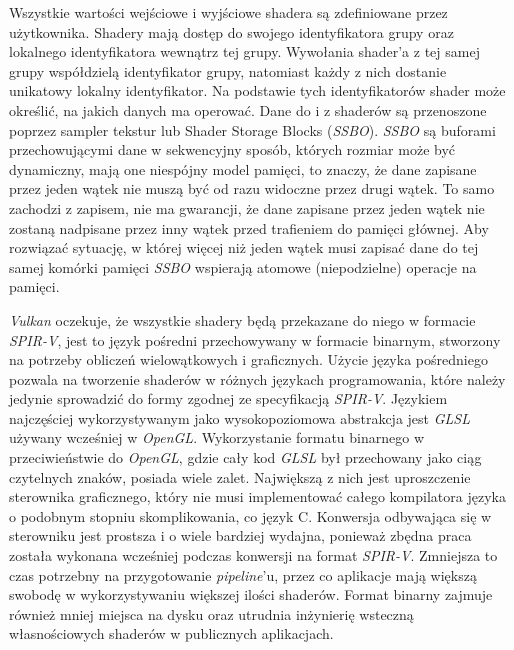 Wszystkie wartości wejściowe i wyjściowe shadera są zdefiniowane przez użytkownika.
Shadery mają dostęp do swojego identyfikatora grupy oraz lokalnego identyfikatora wewnątrz tej grupy.
Wywołania shader'a z tej samej grupy współdzielą identyfikator grupy, natomiast każdy z nich dostanie unikatowy lokalny identyfikator.
Na podstawie tych identyfikatorów shader może określić, na jakich danych ma operować.
Dane do i z shaderów są przenoszone poprzez sampler tekstur lub Shader Storage Blocks (\textit{SSBO}).
\textit{SSBO} są buforami przechowującymi dane w sekwencyjny sposób, których rozmiar może być dynamiczny, mają one niespójny model pamięci, to znaczy, że dane zapisane przez jeden wątek nie muszą być od razu widoczne przez drugi wątek.
To samo zachodzi z zapisem, nie ma gwarancji, że dane zapisane przez jeden wątek nie zostaną nadpisane przez inny wątek przed trafieniem do pamięci głównej.  
Aby rozwiązać sytuację, w której więcej niż jeden wątek musi zapisać dane do tej samej komórki pamięci \textit{SSBO} wspierają atomowe (niepodzielne) operacje na pamięci.

\textit{Vulkan} oczekuje, że wszystkie shadery będą przekazane do niego w formacie \textit{SPIR-V}\cite{SPIRVSpec}, jest to język pośredni przechowywany w formacie binarnym, stworzony na potrzeby obliczeń wielowątkowych i graficznych.
Użycie języka pośredniego pozwala na tworzenie shaderów w różnych językach programowania, które należy jedynie sprowadzić do formy zgodnej ze specyfikacją \textit{SPIR-V}.
Językiem najczęściej wykorzystywanym jako wysokopoziomowa abstrakcja jest \textit{GLSL} używany wcześniej w \textit{OpenGL}.
Wykorzystanie formatu binarnego w przeciwieństwie do \textit{OpenGL}, gdzie cały kod \textit{GLSL} był przechowany jako ciąg czytelnych znaków, posiada wiele zalet.
Największą z nich jest uproszczenie sterownika graficznego, który nie musi implementować całego kompilatora języka o podobnym stopniu skomplikowania, co język C.
Konwersja odbywająca się w sterowniku jest prostsza i o wiele bardziej wydajna, ponieważ zbędna praca została wykonana wcześniej podczas konwersji na format \textit{SPIR-V}.
Zmniejsza to czas potrzebny na przygotowanie \textit{pipeline}'u, przez co aplikacje mają większą swobodę w wykorzystywaniu większej ilości shaderów.
Format binarny zajmuje również mniej miejsca na dysku oraz utrudnia inżynierię wsteczną własnościowych shaderów w publicznych aplikacjach.
